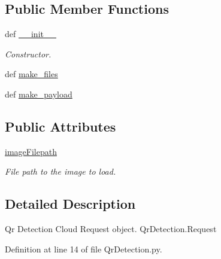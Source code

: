 \subsection*{Public Member Functions}
\begin{DoxyCompactItemize}
\item 
def \hyperlink{classRappCloud_1_1CloudMsgs_1_1QrDetection_1_1QrDetection_1_1Request_a874054f043f3349e9536d57345fc8363}{\-\_\-\-\_\-init\-\_\-\-\_\-}
\begin{DoxyCompactList}\small\item\em Constructor. \end{DoxyCompactList}\item 
def \hyperlink{classRappCloud_1_1CloudMsgs_1_1QrDetection_1_1QrDetection_1_1Request_a667dcfac11b2d19659063ca950ddff0d}{make\-\_\-files}
\item 
def \hyperlink{classRappCloud_1_1CloudMsgs_1_1QrDetection_1_1QrDetection_1_1Request_a17de22a69e8ce51ac72259910e0abbda}{make\-\_\-payload}
\end{DoxyCompactItemize}
\subsection*{Public Attributes}
\begin{DoxyCompactItemize}
\item 
\hyperlink{classRappCloud_1_1CloudMsgs_1_1QrDetection_1_1QrDetection_1_1Request_a6ebdfcb42c3957142127566596c527bb}{image\-Filepath}
\begin{DoxyCompactList}\small\item\em File path to the image to load. \end{DoxyCompactList}\end{DoxyCompactItemize}


\subsection{Detailed Description}
\begin{DoxyVerb}Qr Detection Cloud Request object. QrDetection.Request \end{DoxyVerb}
 

Definition at line 14 of file Qr\-Detection.\-py.




